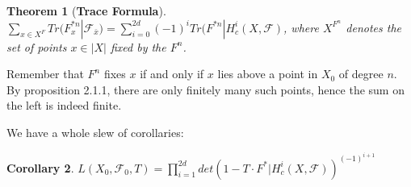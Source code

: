 \documentclass{ucbthesis}
\newtheorem{thm}{Theorem}[section]
\theoremstyle{definition}
\theoremstyle{theorem}
\newtheorem{cor}[thm]{Corollary}
\begin{document}
\begin{thm}[\textbf{Trace Formula}]
$\sum\limits_{x\in X^{F}} Tr(F^{*n}_{x}|\mathcal{F}_{\bar{x}}) = \sum\limits_{i=0}^{2d}(-1)^{i}Tr(F^{*n}|H^{i}_{c}(X,\mathcal{F})$, where $X^{F^{n}}$ denotes the set of points $x\in |X|$ fixed by the $F^{n}$. 
\end{thm}

Remember that $F^{n}$ fixes $x$ if and only if $x$ lies above a point in $X_{0}$ of degree $n$. By proposition 2.1.1, there are only finitely many such points, hence the sum on the left is indeed finite. 

We have a whole slew of corollaries:

\begin{cor}
$L(X_{0},\mathcal{F}_0,T) = \prod\limits_{i=1}^{2d}det(1-T\cdot F^{*}|H^{i}_{c}(X,\mathcal{F}))^{(-1)^{i+1}}$
\end{cor}
\end{document}
